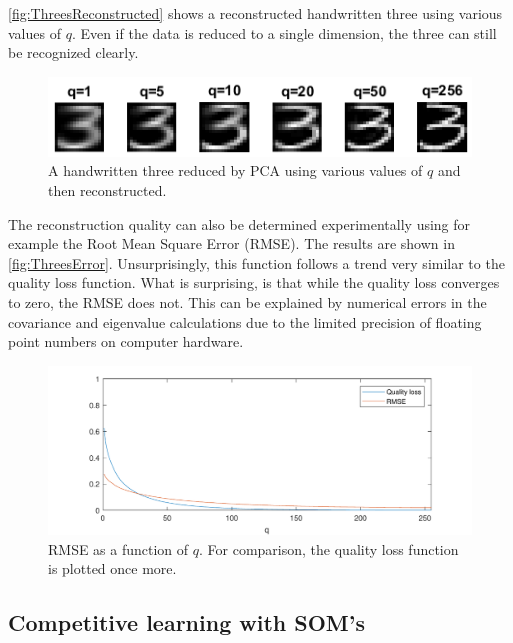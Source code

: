\documentclass[a4, 10pt, twoside, twocolumn]{article}
\numberwithin{figure}{section}
\begin{document}
\autoref{fig:ThreesReconstructed} shows a reconstructed handwritten three using various values of $q$. Even if the data is reduced to a single dimension, the three can still be recognized clearly.

\begin{figure}[ht]
    \includegraphics[width=\linewidth]{img/ThreesReconstructed.png}
    \caption{A handwritten three reduced by PCA using various values of $q$ and then reconstructed.}
    \label{fig:ThreesReconstructed}
\end{figure}

The reconstruction quality can also be determined experimentally using for example the Root Mean Square Error (RMSE). The results are shown in \autoref{fig:ThreesError}. Unsurprisingly, this function follows a trend very similar to the quality loss function. What is surprising, is that while the quality loss converges to zero, the RMSE does not. This can be explained by numerical errors in the covariance and eigenvalue calculations due to the limited precision of floating point numbers on computer hardware.

\begin{figure}[ht]
    \includegraphics[width=\linewidth]{img/ThreesError.pdf}
    \caption{RMSE as a function of $q$. For comparison, the quality loss function is plotted once more.}
    \label{fig:ThreesError}
\end{figure}

\subsection{Competitive learning with SOM’s}
\end{document}
